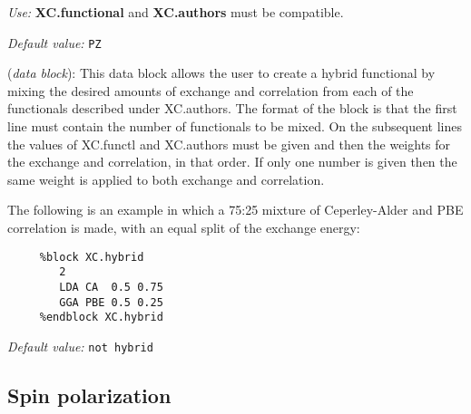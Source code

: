 \documentclass[11pt]{article}
\begin{document}
\begin{description}
\begin{itemize}
\end{itemize}

{\it Use:} {\bf XC.functional} and {\bf XC.authors} must be compatible.

{\it Default value:} {\tt PZ}

\item[{\bf XC.hybrid}] ({\it data block}):
This data block allows the user to create a hybrid functional by
mixing the desired amounts of exchange and correlation from each of
the functionals described under XC.authors.
The format of the block is that the first line must contain the
number of functionals to be mixed. On the subsequent lines the
values of XC.functl and XC.authors must be given and then the
weights for the exchange and correlation, in that order. If only
one number is given then the same weight is applied to both
exchange and correlation.

The following is an example in which a 75:25 mixture of Ceperley-Alder
and PBE correlation is made, with an equal split of the exchange
energy:

\begin{verbatim}
     %block XC.hybrid
        2
        LDA CA  0.5 0.75
        GGA PBE 0.5 0.25
     %endblock XC.hybrid
\end{verbatim}

{\it Default value:} {\tt not hybrid}


\end{description}

\vspace{5pt}
\subsection{Spin polarization}
\end{document}
